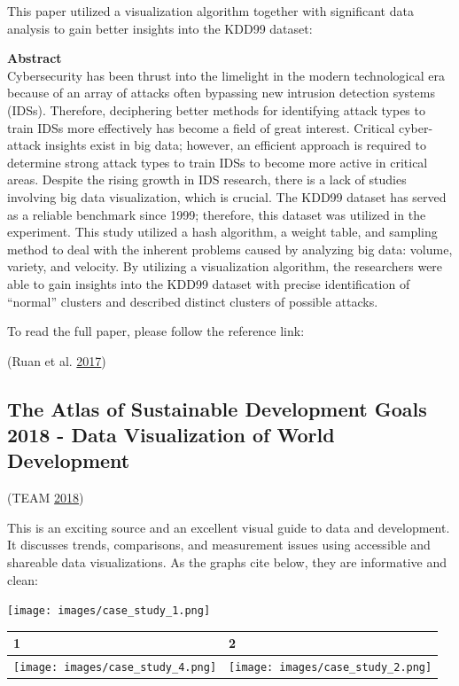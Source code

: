 \documentclass[]{book}
\begin{document}
This paper utilized a visualization algorithm together with significant data analysis to gain better insights into the KDD99 dataset:

\textbf{Abstract}\\
Cybersecurity has been thrust into the limelight in the modern technological era because of an array of attacks often bypassing new intrusion detection systems (IDSs). Therefore, deciphering better methods for identifying attack types to train IDSs more effectively has become a field of great interest. Critical cyber-attack insights exist in big data; however, an efficient approach is required to determine strong attack types to train IDSs to become more active in critical areas. Despite the rising growth in IDS research, there is a lack of studies involving big data visualization, which is crucial. The KDD99 dataset has served as a reliable benchmark since 1999; therefore, this dataset was utilized in the experiment. This study utilized a hash algorithm, a weight table, and sampling method to deal with the inherent problems caused by analyzing big data: volume, variety, and velocity. By utilizing a visualization algorithm, the researchers were able to gain insights into the KDD99 dataset with precise identification of ``normal'' clusters and described distinct clusters of possible attacks.

To read the full paper, please follow the reference link:

(Ruan et al. \protect\hyperlink{ref-gapminder}{2017})

\hypertarget{the-atlas-of-sustainable-development-goals-2018---data-visualization-of-world-development}{%
\subsection{The Atlas of Sustainable Development Goals 2018 - Data Visualization of World Development}\label{the-atlas-of-sustainable-development-goals-2018---data-visualization-of-world-development}}

(TEAM \protect\hyperlink{ref-world_bank_data}{2018})

This is an exciting source and an excellent visual guide to data and development. It discusses trends, comparisons, and measurement issues using accessible and shareable data visualizations. As the graphs cite below, they are informative and clean:

\texttt{[image: images/case\_study\_1.png]}

\begin{longtable}[]{@{}ll@{}}
\toprule
1 & 2\tabularnewline
\midrule
\endhead
\texttt{[image: images/case\_study\_4.png]} & \texttt{[image: images/case\_study\_2.png]}\tabularnewline
\bottomrule
\end{longtable}
\end{document}
